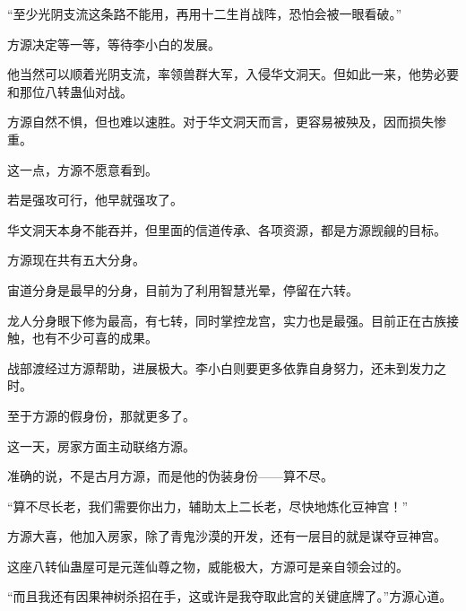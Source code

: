 \begin{this_body}
“至少光阴支流这条路不能用，再用十二生肖战阵，恐怕会被一眼看破。”

方源决定等一等，等待李小白的发展。

他当然可以顺着光阴支流，率领兽群大军，入侵华文洞天。但如此一来，他势必要和那位八转蛊仙对战。

方源自然不惧，但也难以速胜。对于华文洞天而言，更容易被殃及，因而损失惨重。

这一点，方源不愿意看到。

若是强攻可行，他早就强攻了。

华文洞天本身不能吞并，但里面的信道传承、各项资源，都是方源觊觎的目标。

方源现在共有五大分身。

宙道分身是最早的分身，目前为了利用智慧光晕，停留在六转。

龙人分身眼下修为最高，有七转，同时掌控龙宫，实力也是最强。目前正在古族接触，也有不少可喜的成果。

战部渡经过方源帮助，进展极大。李小白则要更多依靠自身努力，还未到发力之时。

至于方源的假身份，那就更多了。

这一天，房家方面主动联络方源。

准确的说，不是古月方源，而是他的伪装身份——算不尽。

“算不尽长老，我们需要你出力，辅助太上二长老，尽快地炼化豆神宫！”

方源大喜，他加入房家，除了青鬼沙漠的开发，还有一层目的就是谋夺豆神宫。

这座八转仙蛊屋可是元莲仙尊之物，威能极大，方源可是亲自领会过的。

“而且我还有因果神树杀招在手，这或许是我夺取此宫的关键底牌了。”方源心道。

\end{this_body}

